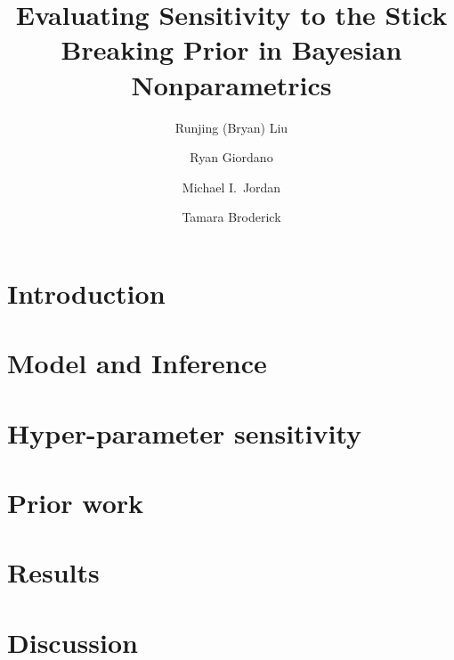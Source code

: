 \documentclass{article}
\title{Evaluating Sensitivity to the Stick Breaking Prior in Bayesian Nonparametrics}
\author[1*]{Runjing (Bryan) Liu}
\author[1*]{Ryan Giordano}
\author[1]{Michael I.~Jordan}
\author[2]{Tamara Broderick}
\affil[*]{These authors contributed equally}
\affil[1]{UC Berkeley}
\affil[2]{MIT}
\begin{document}
\maketitle

\section{Introduction}\label{sec:introduction}


\section{Model and Inference}\label{sec:model}




\section{Hyper-parameter sensitivity}\label{sec:hyper_param_sens}


\section{Prior work}\label{sec:prior_work}



\section{Results}\label{sec:results}


\section{Discussion}\label{sec:discussion}


\newpage



\newpage
\end{document}
